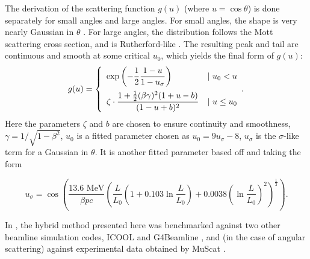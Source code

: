 \documentclass{jacow}
\begin{document}
The derivation of the scattering function $g(u)$ (where  $u = \cos\theta$) is done separately for small angles and large angles. For small angles, the shape is very nearly Gaussian in $\theta$ \cite{GS}. For large angles, the distribution follows the Mott scattering cross section, and is Rutherford-like \cite{Mott}. The resulting peak and tail are continuous and smooth at some critical $u_0$, which yields the final form of $g(u)$:
\begin{equation}
  g(u) = \left\{
  \begin{array}{lr}
    \displaystyle{\exp\left(-\frac{1}{2}\frac{1-u}{1-u_\sigma}\right)} & |\text{ } u_0 < u\vspace*{5pt}\\
    \displaystyle{\zeta\cdot\frac{1+\frac{1}{2}(\beta\gamma)^2(1+u-b)}{(1-u+b)^2}} & | \text{ } u \le u_0
  \end{array}.
\right.
\label{eq:scattering}
\end{equation}
Here the parameters $\zeta$ and $b$ are chosen to ensure continuity and smoothness, $\gamma=1/\sqrt{1-\beta^2}$, $u_0$ is a fitted parameter chosen as $u_0=9u_\sigma-8$, $u_\sigma$ is the $\sigma$-like term for a Gaussian in $\theta$. It is another fitted parameter based off \cite{highland} and taking the form
\begin{footnotesize}
\[
u_\sigma=\cos\left(\frac{13.6 \text{ MeV}}{\beta pc}\left(\frac{L}{L_0}\left(1+0.103\ln\frac{L}{L_0}\right)+0.0038\left(\ln\frac{L}{L_0}\right)^2\right)^\frac{1}{2}\right).
\]
\end{footnotesize}


In \cite{icap15}, the hybrid method presented here was benchmarked against two other beamline simulation codes, ICOOL \cite{ICOOL} and G4Beamline \cite{G4BL}, and (in the case of angular scattering) against experimental data obtained by MuScat \cite{Muscat}.

\end{document}
